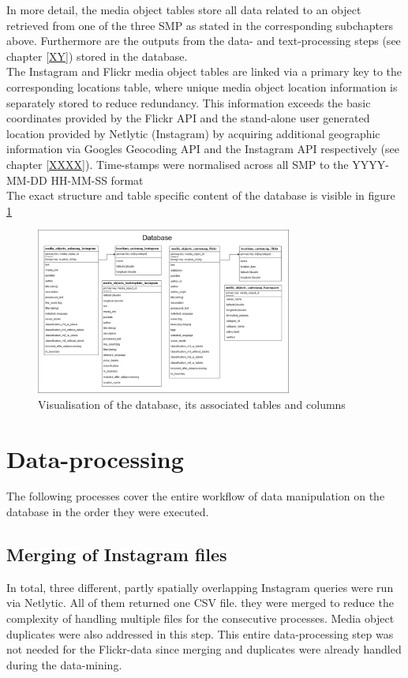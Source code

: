 In more detail, the media object tables store all data related to an object retrieved from one of the three SMP as stated in the corresponding subchapters above. Furthermore are the outputs from the data- and text-processing steps (see chapter \ref{XY}) stored in the database.\\ 
The Instagram and Flickr media object tables are linked via a primary key to the corresponding locations table, where unique media object location information is separately stored to reduce redundancy. This information exceeds the basic coordinates provided by the Flickr API and the stand-alone user generated location provided by Netlytic (Instagram) by acquiring additional geographic information via Googles Geocoding API and the Instagram API respectively (see chapter \ref{XXXX}). Time-stamps were normalised across all SMP to the YYYY-MM-DD HH-MM-SS format \\
\newline
The exact structure and table specific content of the database is visible in figure \ref{fig:database}

\begin{figure}[h]
   \centering
   \includegraphics[width=0.75\textwidth]{img/fusion_db_overview}
   \caption{Visualisation of the database, its associated tables and columns}
   \label{fig:database}
\end{figure}

\section{Data-processing} \label{data_processing}
The following processes cover the entire workflow of data manipulation on the database in the order they were executed.
\subsection{Merging of Instagram files} \label{netlytic_files_merge}
In total, three different, partly spatially overlapping Instagram queries were run via Netlytic. All of them returned one CSV file. they were merged to reduce the complexity of handling multiple files for the consecutive processes. Media object duplicates were also addressed in this step. This entire data-processing step was not needed for the Flickr-data since merging and duplicates were already handled during the data-mining.

